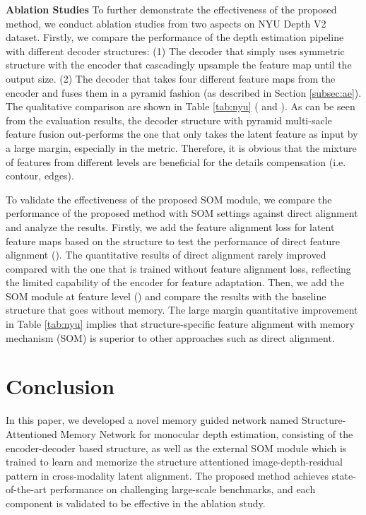 \documentclass[letterpaper]{article} \usepackage{aaai20}  \usepackage{times}  \usepackage{helvet} \usepackage{courier}  \usepackage{graphicx} \frenchspacing  \setlength{\pdfpagewidth}{8.5in}  \setlength{\pdfpageheight}{11in}  \usepackage{epsfig}
\begin{document}
    \textbf{Ablation Studies} \hspace{0.3cm} To further demonstrate the effectiveness of the proposed method, we conduct ablation studies from two aspects on NYU Depth V2 dataset. Firstly, we compare the performance of the depth estimation pipeline with different decoder structures: (1) The decoder that simply uses symmetric structure with the encoder that cascadingly upsample the feature map until the output size. (2) The decoder that takes four different feature maps from the encoder and fuses them in a pyramid fashion (as described in Section \ref{subsec:ae}). The qualitative comparison are shown in Table \ref{tab:nyu} ( and ). As can be seen from the evaluation results, the decoder structure with pyramid multi-sacle feature fusion out-performs the one that only takes the latent feature as input by a large margin, especially in the  metric. Therefore, it is obvious that the mixture of features from different levels are beneficial for the details compensation (i.e. contour, edges).
  
    To validate the effectiveness of the proposed SOM module, we compare the performance of the proposed method with SOM settings against direct alignment and analyze the results. Firstly, we add the feature alignment loss for latent feature maps based on the  structure to test the performance of direct feature alignment (). The quantitative results of direct alignment rarely improved compared with the one that is trained without feature alignment loss, reflecting the limited capability of the encoder for feature adaptation. Then, we add the SOM module at feature level () and compare the results with the baseline structure that goes without memory. The large margin quantitative improvement in Table \ref{tab:nyu} implies that structure-specific feature alignment with memory mechanism (SOM) is superior to other approaches such as direct alignment. 
    
    \section{Conclusion}
    In this paper, we developed a novel memory guided network named Structure-Attentioned Memory Network for monocular depth estimation, consisting of the encoder-decoder based structure, as well as the external SOM module which is trained to learn and memorize the structure attentioned image-depth-residual pattern in cross-modality latent alignment. The proposed method achieves state-of-the-art performance on challenging large-scale benchmarks, and each component is validated to be effective in the ablation study. 
    
    
    
    
    
\end{document}

